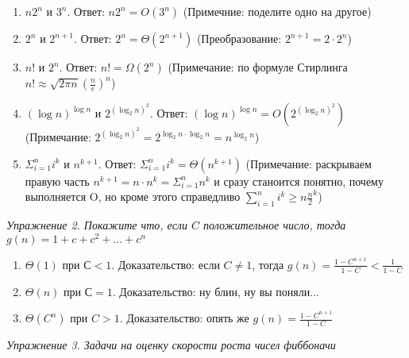 \begin{enumerate}
\item $ n2^n $ и $ 3^n $. Ответ: $ n2^n = O ( 3^n ) $ (Примечние: поделите одно на другое)

\item $ 2^n $ и $ 2^{n+1} $. Ответ: $ 2^n  = \Theta ( 2^{n+1} ) $ (Преобразование: $ 2^{n+1} = 2 \cdot 2^{n} $)

\item $ n! $ и $ 2^n $. Ответ: $ n! = \Omega ( 2^n ) $ (Примечание: по формуле Стирлинга $ n! \approx \sqrt{2 \pi n} \left ( \frac{n}{e} \right )^n $)

\item $ (\log n) ^ {\log n} $ и $ 2^{(\log _2 n)^2} $. Ответ: $ (\log n) ^ {\log n} = O ( 2^{(\log _2 n)^2} ) $ (Примечание: $ 2^{(\log _2 n)^2} = 2^{\log _2 n \cdot \log _2 n} = n^{\log _2 n} $)

\item $ \Sigma ^n _{i=1} i^k $ и $ n^{k+1} $. Ответ: $ \Sigma ^n _{i=1} i^k = \Theta ( n^{k+1} ) $ (Примечание: раскрываем правую часть $ n^{k+1} = n \cdot n^{k} = \Sigma ^n _{i=1} n^k $ и сразу станоится понятно, почему выполняется O, но кроме этого справедливо $\sum^{n}_{i=1} i^k \ge n \frac{n}{2}^k$)
\end{enumerate}

\textit{Упражнение 2. Покажите что, если $ C $ положительное число, тогда $ g(n) = 1 + c + c^2 + ... + c^n $}

\begin{enumerate}
\item $ \Theta ( 1 ) $ при $ С < 1 $. Доказательство: если $ C \ne 1 $, тогда $ g(n) = \frac{1 - C^{n+1}}{1 - C} < \frac{1}{1 - C} $

\item $ \Theta (n) $ при $ С = 1 $. Доказательство: ну блин, ну вы поняли...

\item $ \Theta (C^n) $ при $ C > 1 $. Доказательство: опять же $ g(n) = \frac{1 - C^{n+1}}{1 - C} $
\end{enumerate}

\textit{Упражнение 3. Задачи на оценку скорости роста чисел фиббоначи}

